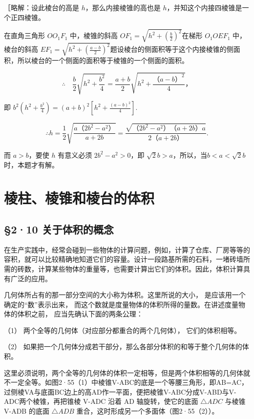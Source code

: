 ［略解：设此棱台的高是 \(h\)，那么内接棱锥的高也是
\(h\)，并知这个内接四棱锥是一个正四棱锥。

在直角三角形 \(OO_{1}F_{1}\) 中，棱锥的斜高
\(OF_{1} = \sqrt{h^{2} + \left(\frac{b}{2}\right)^{2}}\)在梯形
\(O_{1}OEF_{1}\) 中，棱台的斜高
\(EF_{1} = \sqrt{h^{2} + \left(\frac{a - b}{2}\right)^{2}}\)题设棱台的侧面积等于这个内接棱锥的侧面积，所以棱台的一个侧面的面积等于棱锥的一个侧面的面积。

\[
\therefore \quad \frac {b}{2} \sqrt {h ^ {2} + \frac {b ^ {2}}{4}} = \frac {a + b}{2} \sqrt {h ^ {2} + \frac {\text{（}a - b\text{）} ^ {2}}{4}}\text{，}
\]

即
\(b^{2}\left(h^{2} + \frac{b^{2}}{4}\right) = (a + b)^{2}\left[h^{2} + \frac{(a - b)^{2}}{4}\right].\)

\[
\therefore h = \frac {1}{2} \sqrt {\frac {a \text{（}2 b ^ {2} - a ^ {2}\text{）}}{a + 2 b}} = \frac {\sqrt {\text{（}2 b ^ {2} - a ^ {2}\text{）} \text{（}a + 2 b\text{）} a}}{2 \text{（}a + 2 b\text{）}}.
\]

而 \(a > b\)，要使 \(h\) 有意义必须 \(2b^{2} - a^{2} > 0\)，即
\(\sqrt{2} b > a\)，所以，当\(b < a < \sqrt{2} b\) 时，本题才有解。

\section{棱柱、棱锥和棱台的体积}

\subsection{§2·10
关于体积的概念}

在生产实践中，经常会碰到一些物体的计算问题，例如，计算了仓库、厂房等等的容积，就可以比较精确地知道它们的容量。设计一段路基所需的石料，一堵砖墙所需的砖数，计算某些物体的重量等，也需要计算出它们的体积。因此，体积计算具有广泛的应用。

几何体所占有的那一部分空间的大小称为体积。这里所说的大小，
是应该用一个确定的``数''表示出来，
而这个数就是度量物体的体积所得的量数。在讲述度量物体的体积之前，
应当先确认下面的两条公理：

（1） 两个全等的几何体（对应部分都重合的两个几何体）， 它们的体积相等。

（2）
如果把一个几何体分成若干部分，那么各部分体积的和等于整个几何体的体积。

这里必须说明，两个全等的几何体的体积一定相等，但是两个体积相等的几何体就不一定全等。如图2·55（1）中棱锥V-ABC的底是一个等腰三角形，即AB=AC，过侧棱VA与底面BC边上的高AD作一平面，便把棱锥V-ABC分成V-ABD与V-ADC两个棱锥，再把锥棱
V-ADC 沿着 AD 轴旋转，使它的底面 \(\triangle ADC\) 与棱锥 V-ADB 的底面
\(\triangle ADB\) 重合，这时形成另一个多面体（图2·55（2））。

